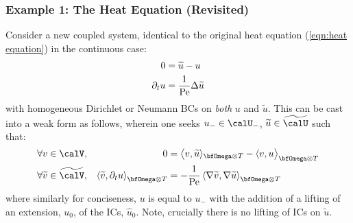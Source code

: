 \subsubsection{Example 1: The Heat Equation (Revisited)}
    Consider a new coupled system, identical to the original heat equation (\ref{eqn:heat equation}) in the continuous case:
    \begin{align}
                    0  &=  \widetilde{u} - u  \\
        \partial_{t}u  &=  \frac{1}{\mathrm{Pe}}\Delta\widetilde{u}
    \end{align}
    with homogeneous Dirichlet or Neumann BCs on \emph{both} $u$ and $\widetilde{u}$. This can be cast into a weak form as follows, wherein one seeks $u_{-}  \in  \calU_{-}$, $\widetilde{u}  \in  \widetilde{\calU}$ such that:
    \begin{align}
        &\forall  v  \in  \calV,  &  0  &=  \left\langle v, \widetilde{u}\rangle_{\bfOmega\otimes T} - \langle v, u\right\rangle_{\bfOmega\otimes T}  \label{eqn:heat equation auxiliary weak form 1}  \\
        &\forall  \widetilde{v}  \in  \widetilde{\calV},  &  \left\langle\widetilde{v}, \partial_{t}u\right\rangle_{\bfOmega\otimes T}  &=  - \frac{1}{\rmPe}\left\langle\nabla\widetilde{v}, \nabla\widetilde{u}\right\rangle_{\bfOmega\otimes T}  \label{eqn:heat equation auxiliary weak form 2}
    \end{align}
    where similarly for conciseness, $u$ is equal to $u_{-}$ with the addition of a lifting of an extension, $u_{0}$, of the ICs, $\widehat{u}_{0}$. Note, crucially there is no lifting of ICs on $\widetilde{u}$.

